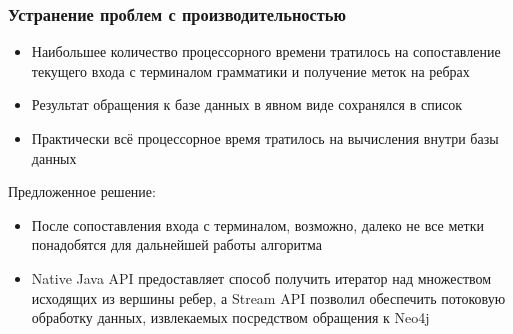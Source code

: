 \documentclass{beamer}
\begin{document}
\begin{frame}
\transwipe[direction=90]
 \frametitle{Устранение проблем с производительностью}
\begin{itemize}
    \item Наибольшее количество процессорного времени тратилось на сопоставление текущего входа с терминалом грамматики и получение меток на ребрах
    \item Результат обращения к базе данных в явном виде сохранялся в список
    \item Практически всё процессорное время тратилось на вычисления внутри базы данных
\end{itemize}
Предложенное решение:
 \begin{itemize}
     \item После сопоставления входа с терминалом, возможно, далеко не все метки понадобятся для дальнейшей работы алгоритма
     \item Native Java API предоставляет способ получить итератор над множеством исходящих из вершины ребер, а Stream API позволил обеспечить потоковую обработку данных, извлекаемых посредством обращения к Neo4j
 \end{itemize}
\end{frame}
\end{document}
